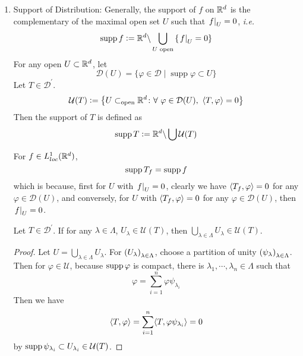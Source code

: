 \begin{enumerate}[label=\arabic*.]
	\item Support of Distribution: Generally, the support of $f$ on $\mathbb{R}^d$ is the complementary of the maximal open set $U$ such that $\left.f\right\lvert_U = 0$, \emph{i.e.}
	\begin{equation*}
		\operatorname{supp} f \vcentcolon= \mathbb{R}^d \backslash \bigcup_{U \text{ open}} \left\{\left.f\right\lvert_U = 0\right\}
	\end{equation*}
	For any open $U \subset \mathbb{R}^d$, let
	\begin{equation*}
		\mathcal{D}(U)=\{\varphi \in \mathcal{D} \mid \operatorname{supp} \varphi \subset U\}
	\end{equation*}
	Let $T \in \mathcal{D}^\prime$.
	\begin{equation*}
		\mathcal{U}(T) \vcentcolon= \left\{U \subset_\text{open} \mathbb{R}^d \colon \forall~\varphi \in \mathcal{D}(U),~\langle T,\varphi \rangle = 0\right\}
	\end{equation*}
	Then the support of $T$ is defined as
	\begin{equation*}
		\operatorname{supp} T \vcentcolon= \mathbb{R}^d \backslash \bigcup \mathcal{U}(T)
	\end{equation*}
	\begin{rmk}
		For $f \in L^1_{loc}(\mathbb{R}^d)$, 
		\begin{equation*}
			\operatorname{supp} T_f = \operatorname{supp} f
		\end{equation*}
		which is because, first for $U$ with $\left.f\right\lvert_U =0$, clearly we have $\langle T_f, \varphi \rangle = 0$ for any $\varphi \in \mathcal{D}(U)$, and conversely, for $U$ with $\langle T_f, \varphi \rangle = 0$ for any $\varphi \in \mathcal{D}(U)$, then $\left.f\right\lvert_U =0$.
	\end{rmk}

	\begin{prop}
		Let $T \in \mathcal{D}^\prime$. If for any $\lambda \in \Lambda$, $U_\lambda \in \mathcal{U}(T)$, then $\bigcup_{\lambda \in \Lambda}U_\lambda \in \mathcal{U}(T)$.
	\end{prop}
	\begin{proof}
		Let $U = \bigcup_{\lambda \in \Lambda}U_\lambda$. For $\left(U_\lambda\right)_{\lambda \in \Lambda}$, choose a partition of unity $\left(\psi_\lambda\right)_{\lambda \in \Lambda}$. Then for $\varphi \in \mathcal{U}$, because $\operatorname{supp} \varphi$ is compact, there is $\lambda_1,\cdots,\lambda_n \in \Lambda$ such that
		\begin{equation*}
			\varphi = \sum_{i=1}^n \varphi \psi_{\lambda_i}
		\end{equation*}
		Then we have
		\begin{equation*}
			\langle T,\varphi \rangle = \sum_{i=1}^n \langle T,\varphi \psi_{\lambda_i} \rangle = 0
		\end{equation*}
		by $\operatorname{supp} \psi_{\lambda_i} \subset U_{\lambda_i} \in \mathcal{U}(T)$.
	\end{proof}


\end{enumerate}
